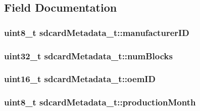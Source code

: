\subsection{Field Documentation}
\hypertarget{structsdcardMetadata__t_a3f0da8fca31669569d85eaae71ad5cbe}{
\subsubsection[{manufacturer\+I\+D}]{\setlength{\rightskip}{0pt plus 5cm}uint8\+\_\+t sdcard\+Metadata\+\_\+t\+::manufacturer\+I\+D}}\label{structsdcardMetadata__t_a3f0da8fca31669569d85eaae71ad5cbe}
\hypertarget{structsdcardMetadata__t_a20b075fbadbe3cd318f94c3114069f2d}{
\subsubsection[{num\+Blocks}]{\setlength{\rightskip}{0pt plus 5cm}uint32\+\_\+t sdcard\+Metadata\+\_\+t\+::num\+Blocks}}\label{structsdcardMetadata__t_a20b075fbadbe3cd318f94c3114069f2d}
\hypertarget{structsdcardMetadata__t_a2cfb45a7c55329e52ed0d501d0afb10d}{
\subsubsection[{oem\+I\+D}]{\setlength{\rightskip}{0pt plus 5cm}uint16\+\_\+t sdcard\+Metadata\+\_\+t\+::oem\+I\+D}}\label{structsdcardMetadata__t_a2cfb45a7c55329e52ed0d501d0afb10d}
\hypertarget{structsdcardMetadata__t_a412979af914ca3731f4a74ae5bc78e04}{
\subsubsection[{production\+Month}]{\setlength{\rightskip}{0pt plus 5cm}uint8\+\_\+t sdcard\+Metadata\+\_\+t\+::production\+Month}}\label{structsdcardMetadata__t_a412979af914ca3731f4a74ae5bc78e04}
